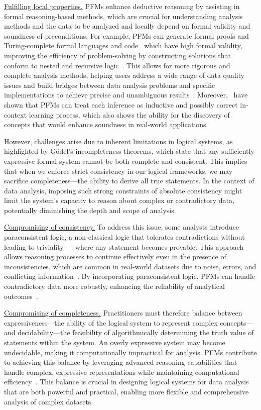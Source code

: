   \underline{Fulfilling local properties.} PFMs enhance deductive reasoning by assisting in formal reasoning-based methods, which are crucial for understanding analysis methods and the data to be analyzed and locally depend on formal validity and soundness of preconditions. For example, PFMs can generate formal proofs and Turing-complete formal languages and code~\cite{Li2024IsPB} which have high formal validity, improving the efficiency of problem-solving by constructing solutions that conform to nested and recursive logic~\cite{Khakhar2023PACPS}. This allows for more rigorous and complete analysis methods, helping users address a wide range of data quality issues and build bridges between data analysis problems and specific implementations to achieve precise and unambiguous results~\cite{qi2024cleanagent}. Moreover,~\cite {Li2024IsPB} have shown that PFMs can treat each inference as inductive and possibly correct in-context learning process, which also shows the ability for the discovery of concepts that would enhance soundness in real-world applications.
  
  However, challenges arise due to inherent limitations in logical systems, as highlighted by Gödel's incompleteness theorems, which state that any sufficiently expressive formal system cannot be both complete and consistent. This implies that when we enforce strict consistency in our logical frameworks, we may sacrifice completeness—the ability to derive all true statements. In the context of data analysis, imposing such strong constraints of absolute consistency might limit the system's capacity to reason about complex or contradictory data, potentially diminishing the depth and scope of analysis.
  
  \underline{Compromising of consistency.} To address this issue, some analysts introduce paraconsistent logic, a non-classical logic that tolerates contradictions without leading to triviality — where any statement becomes provable. This approach allows reasoning processes to continue effectively even in the presence of inconsistencies, which are common in real-world datasets due to noise, errors, and conflicting information~\cite{022batini2009methodologies}. By incorporating paraconsistent logic, PFMs can handle contradictory data more robustly, enhancing the reliability of analytical outcomes~\cite{037little2019statistical}.
  
  \underline{Compromising of completeness.} Practitioners must therefore balance between expressiveness—the ability of the logical system to represent complex concepts—and decidability—the feasibility of algorithmically determining the truth value of statements within the system. An overly expressive system may become undecidable, making it computationally impractical for analysis. PFMs contribute to achieving this balance by leveraging advanced reasoning capabilities that handle complex, expressive representations while maintaining computational efficiency~\cite{Pei2023CanLL, Wang2024TheoremLlamaTG}. This balance is crucial in designing logical systems for data analysis that are both powerful and practical, enabling more flexible and comprehensive analysis of complex datasets.
  
